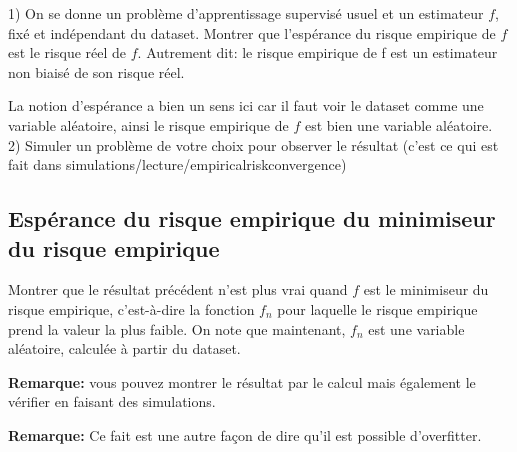 \documentclass[
10pt, %
a4paper, %
oneside, %
headinclude,footinclude, %
BCOR5mm, %
]{scrartcl}
\begin{document}
1) On se donne un problème d’apprentissage supervisé usuel et un estimateur $f$, fixé et indépendant du dataset. Montrer que l’espérance du risque empirique de $f$ est le risque réel de $f$. Autrement dit: le risque empirique de f est un estimateur non biaisé de son risque réel.

La notion d’espérance a bien un sens ici car il faut voir le dataset comme une variable aléatoire, ainsi le risque empirique de $f$ est bien une variable aléatoire.
\\


2) Simuler un problème de votre choix pour observer le résultat (c’est ce qui est fait dans simulations/lecture/empirical\textunderscore risk\textunderscore convergence)

\subsection{Espérance du risque empirique du minimiseur du risque empirique}

Montrer que le résultat précédent n'est plus vrai quand $f$ est le minimiseur du risque empirique, c'est-à-dire la fonction $f_n$ pour laquelle le risque empirique prend la valeur la plus faible. On note que maintenant, $f_n$ est une variable aléatoire, calculée à partir du dataset.

\textbf{Remarque:} vous pouvez montrer le résultat par le calcul mais également le vérifier en faisant des simulations.

\textbf{Remarque:} Ce fait est une autre façon de dire qu'il est possible d'overfitter.
\end{document}
